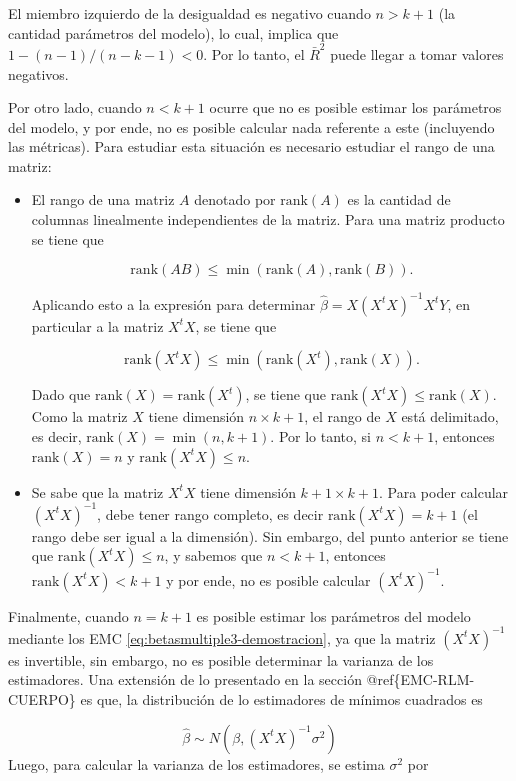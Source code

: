\documentclass[
  11pt,
]{book}
\theoremstyle{definition}
\theoremstyle{definition}
\theoremstyle{definition}
\theoremstyle{definition}
\theoremstyle{remark}
\begin{document}
El miembro izquierdo de la desigualdad es negativo cuando \(n > k+1\) (la cantidad parámetros del modelo), lo cual, implica que \(1-(n-1)/(n-k-1) < 0\). Por lo tanto, el \(\bar{R}^2\) puede llegar a tomar valores negativos.

Por otro lado, cuando \(n < k+1\) ocurre que no es posible estimar los parámetros del modelo, y por ende, no es posible calcular nada referente a este (incluyendo las métricas). Para estudiar esta situación es necesario estudiar el rango de una matriz:

\begin{itemize}
\item
  El rango de una matriz \(A\) denotado por \(\text{rank}(A)\) es la cantidad de columnas linealmente independientes de la matriz. Para una matriz producto se tiene que

  \[\text{rank}(AB) \leq \min(\text{rank}(A), \text{rank}(B)).\]

  Aplicando esto a la expresión para determinar \(\widehat{\beta} = X(X^tX)^{-1}X^tY\), en particular a la matriz \(X^tX\), se tiene que

  \[\text{rank}(X^tX) \leq \min(\text{rank}(X^t), \text{rank}(X)).\]

  Dado que \(\text{rank}(X) = \text{rank}(X^t)\), se tiene que \(\text{rank}(X^tX) \leq \text{rank}(X)\). Como la matriz \(X\) tiene dimensión \(n \times k+1\), el rango de \(X\) está delimitado, es decir, \(\text{rank}(X) = \min(n,k+1)\). Por lo tanto, si \(n < k+1\), entonces \(\text{rank}(X) = n\) y \(\text{rank}(X^tX) \leq n\).
\item
  Se sabe que la matriz \(X^tX\) tiene dimensión \(k+1 \times k+1\). Para poder calcular \((X^tX)^{-1}\), debe tener rango completo, es decir \(\text{rank}(X^tX) = k+1\) (el rango debe ser igual a la dimensión). Sin embargo, del punto anterior se tiene que \(\text{rank}(X^tX) \leq n\), y sabemos que \(n < k+1\), entonces \(\text{rank}(X^tX) < k+1\) y por ende, no es posible calcular \((X^tX)^{-1}\).
\end{itemize}

Finalmente, cuando \(n=k+1\) es posible estimar los parámetros del modelo mediante los EMC \eqref{eq:betasmultiple3-demostracion}, ya que la matriz \((X^tX)^{-1}\) es invertible, sin embargo, no es posible determinar la varianza de los estimadores. Una extensión de lo presentado en la sección @ref\{EMC-RLM-CUERPO\} es que, la distribución de lo estimadores de mínimos cuadrados es

\[
\widehat{\beta} \sim N(\beta, (X^tX)^{-1}\sigma^2)
\]
Luego, para calcular la varianza de los estimadores, se estima \(\sigma^2\) por
\end{document}
